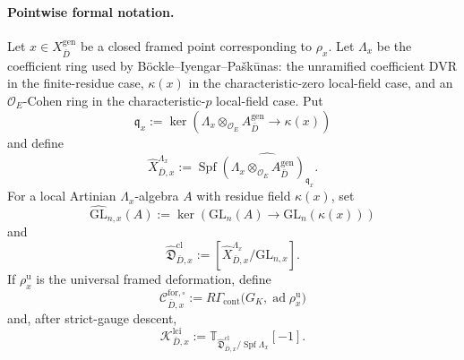 \documentclass[11pt]{article}
\theoremstyle{definition}
\begin{document}
\paragraph{Pointwise formal notation.}
Let $x\in X_{\bar D}^{\mathrm{gen}}$ be a closed framed point corresponding to $\rho_x$.  Let $\Lambda_x$ be the coefficient ring used by B\"ockle--Iyengar--Pa\v{s}k\=unas: the unramified coefficient DVR in the finite-residue case, $\kappa(x)$ in the characteristic-zero local-field case, and an $\mathcal O_E$-Cohen ring in the characteristic-$p$ local-field case.  Put
\[
\mathfrak q_x
:=\ker\!\left(
\Lambda_x\otimes_{\mathcal O_E}A_{\bar D}^{\mathrm{gen}}
\longrightarrow\kappa(x)
\right)
\]
and define
\begin{equation}\label{eq:coefficient-expanded-framed-completion}
\widehat X^{\Lambda_x}_{\bar D,x}
:=\operatorname{Spf}
\widehat{\left(\Lambda_x\otimes_{\mathcal O_E}
A_{\bar D}^{\mathrm{gen}}\right)_{\mathfrak q_x}}.
\end{equation}
For a local Artinian $\Lambda_x$-algebra $A$ with residue field $\kappa(x)$, set
\begin{equation}\label{eq:strict-frame-group}
\widehat{\mathrm{GL}}_{n,x}(A)
:=\ker\!\left(
\mathrm{GL}_n(A)\longrightarrow\mathrm{GL}_n(\kappa(x))
\right)
\end{equation}
and
\begin{equation}\label{eq:strict-gauge-formal-quotient}
\widehat{\mathfrak D}^{\mathrm{cl}}_{\bar D,x}
:=\left[
\widehat X^{\Lambda_x}_{\bar D,x}/
\widehat{\mathrm{GL}}_{n,x}
\right].
\end{equation}
If $\rho_x^{\mathrm u}$ is the universal framed deformation, define
\begin{equation}\label{eq:intrinsic-formal-cochain-carrier}
\mathcal C^{\mathrm{for},\square}_{\bar D,x}
:=R\Gamma_{\mathrm{cont}}
\bigl(G_K,\operatorname{ad}\rho_x^{\mathrm u}\bigr)
\end{equation}
and, after strict-gauge descent,
\begin{equation}\label{eq:classical-lci-formal-carrier}
\mathcal K^{\mathrm{lci}}_{\bar D,x}
:=\mathbb T_{
\widehat{\mathfrak D}^{\mathrm{cl}}_{\bar D,x}/
\operatorname{Spf}\Lambda_x}[-1].
\end{equation}
\end{document}
